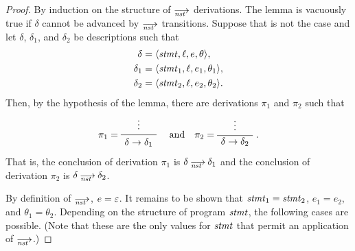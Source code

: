 
\lemxdetnst*
\begin{proof}
  By induction on the structure of $\nst$ derivations.  The lemma is
  vacuously true if $\delta$ cannot be advanced by $\nst$ transitions.
  Suppose that is not the case and let $\delta$, $\delta_1$, and $\delta_2$
  be descriptions such that
  \begin{align*}
    \delta  &=\<\stmt,\ell,e,\theta>,\\
    \delta_1&=\<\stmt_1,\ell,e_1,\theta_1>,\\
    \delta_2&=\<\stmt_2,\ell,e_2,\theta_2>.
  \end{align*}
  Then, by the hypothesis of the lemma, there are derivations $\pi_1$
  and $\pi_2$ such that
  \[
    \pi_1=\null
    \AxiomC{\strut$\vdots$}
    \UnaryInfC{\strut$\delta\to\delta_1$}
    \raisebox{5pt}{\DisplayProof}
    \quad\text{and}\quad
    \pi_2=\null
    \AxiomC{\strut$\vdots$}
    \UnaryInfC{$\delta\to\delta_2$}
    \raisebox{5pt}{\DisplayProof}.
  \]
  That is, the conclusion of derivation $\pi_1$ is $\delta\nst\delta_1$ and
  the conclusion of derivation $\pi_2$ is $\delta\nst\delta_2$.

  By definition of $\nst$, $e=\varepsilon$.  It remains to be shown that
  $\mathit{stmt}_1=\mathit{stmt}_2$, $e_1=e_2$, and $\theta_1=\theta_2$.  Depending on the
  structure of program $\mathit{stmt}$, the following cases are possible.  (Note
  that these are the only values for $\mathit{stmt}$ that permit an application of
  $\nst$.)


\end{proof}
